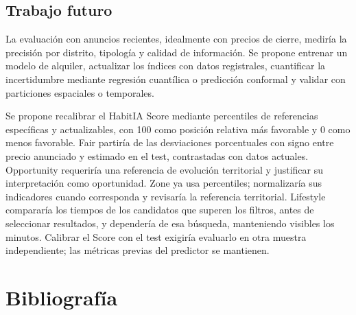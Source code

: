\documentclass[11pt,a4paper]{article}
\begin{document}
\subsection{Trabajo futuro}

La evaluación con anuncios recientes, idealmente con precios de cierre, mediría la precisión por distrito, tipología y calidad de información. Se propone entrenar un modelo de alquiler, actualizar los índices con datos registrales, cuantificar la incertidumbre mediante regresión cuantílica o predicción conformal y validar con particiones espaciales o temporales.

Se propone recalibrar el HabitIA Score mediante percentiles de referencias específicas y actualizables, con 100 como posición relativa más favorable y 0 como menos favorable. Fair partiría de las desviaciones porcentuales con signo entre precio anunciado y estimado en el test, contrastadas con datos actuales. Opportunity requeriría una referencia de evolución territorial y justificar su interpretación como oportunidad. Zone ya usa percentiles; normalizaría sus indicadores cuando corresponda y revisaría la referencia territorial. Lifestyle compararía los tiempos de los candidatos que superen los filtros, antes de seleccionar resultados, y dependería de esa búsqueda, manteniendo visibles los minutos. Calibrar el Score con el test exigiría evaluarlo en otra muestra independiente; las métricas previas del predictor se mantienen.

\clearpage
\section{Bibliografía}
\end{document}
